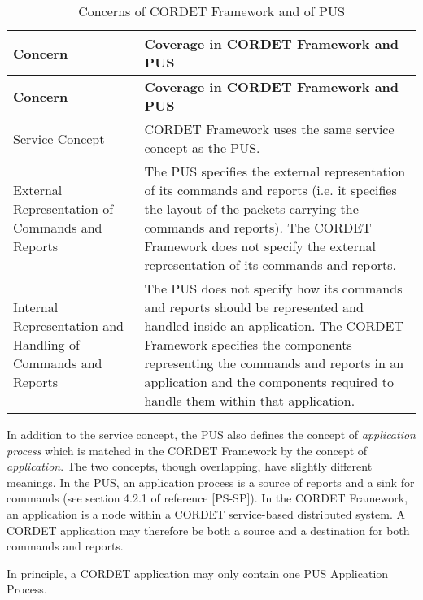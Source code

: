 \begin{longtable}{|>{\raggedright\arraybackslash}p{3cm}|p{10cm}|}
\caption{Concerns of CORDET Framework and of PUS}\label{tab:PusCrConcerns} \\
\hline
\rowcolor{light-gray}
\textbf{Concern} & \textbf{Coverage in CORDET Framework and PUS}\\
\hline\hline
\endfirsthead
\rowcolor{light-gray}
\textbf{Concern} & \textbf{Coverage in CORDET Framework and PUS}\\
\hline\hline
\endhead
Service Concept & CORDET Framework uses the same service concept as the PUS.\\
\hline
External Representation of Commands and Reports & The PUS specifies the external representation of its commands and reports (i.e. it specifies the layout of the packets carrying the commands and reports). The CORDET Framework does not specify the external representation of its commands and reports.\\
\hline
Internal Representation and Handling of Commands and Reports & The PUS does not specify how its commands and reports should be represented and handled inside an application. The CORDET Framework specifies the components representing the commands and reports in an application and the components required to handle them within that application.\\
\hline
\end{longtable}

In addition to the service concept, the PUS also defines the concept of \textit{application process} which is matched in the CORDET Framework by the concept of \textit{application}. The two concepts, though overlapping, have slightly different meanings. In the PUS, an application process is a source of reports and a sink for commands (see section 4.2.1 of reference [PS-SP]). In the CORDET Framework, an application is a node within a CORDET service-based distributed system. A CORDET application may therefore be both a source and a destination for both commands and reports. 

In principle, a CORDET application may only contain one PUS Application Process. 
